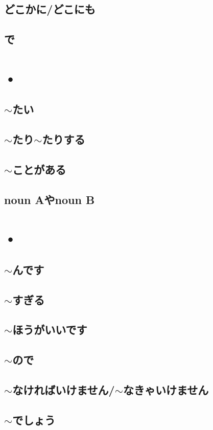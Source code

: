 \documentclass{article}
\begin{document}
   \subsection{どこかに/どこにも}
   \subsection{で}
   
   \newpage
   
   \section{•}
   \subsection{$\sim$たい}
   \subsection{$\sim$たり$\sim$たりする}
   \subsection{$\sim$ことがある}
   \subsection{noun Aやnoun B}
   
   \newpage
   
   \section{•}
   \subsection{$\sim$んです}
   \subsection{$\sim$すぎる}
   \subsection{$\sim$ほうがいいです}
   \subsection{$\sim$ので}
   \subsection{$\sim$なければいけません/$\sim$なきゃいけません}
   \subsection{$\sim$でしょう}
   
   
   
   
   
   
\end{document}
